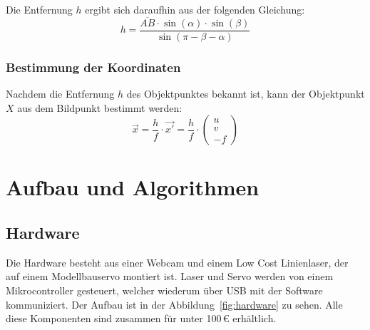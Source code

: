 \documentclass[ngerman,a4paper,parskip=half]{scrartcl}
\begin{document}
Die Entfernung $h$ ergibt sich daraufhin aus der folgenden Gleichung:
\[ h = \frac{\overline{AB} \cdot \sin(\alpha) \cdot \sin(\beta)}{\sin(\pi - \beta - \alpha)} \]

\subsubsection{Bestimmung der Koordinaten}

Nachdem die Entfernung $h$ des Objektpunktes bekannt ist, kann der Objektpunkt $X$ aus dem Bildpunkt bestimmt werden:
\[ \vec{x} = \frac{h}{f} \cdot \vec{x'} = \frac{h}{f} \cdot \begin{pmatrix}
u \\ v \\ -f
\end{pmatrix} \]


\section{Aufbau und Algorithmen}
\label{sec:realization}

\subsection{Hardware}

Die Hardware besteht aus einer Webcam und einem Low Cost Linienlaser, der auf einem Modellbauservo montiert ist. Laser und Servo werden von einem Mikrocontroller gesteuert, welcher wiederum über USB mit der Software kommuniziert. Der Aufbau ist in der Abbildung~\ref{fig:hardware} zu sehen. Alle diese Komponenten sind zusammen für unter 100\,€ erhältlich.
\end{document}
